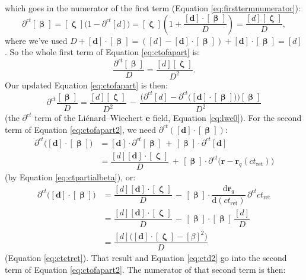 \documentclass[12pt]{article}
\renewcommand{\vv}[1]{\mathbf{#1}}
\newcommand{\dd}[1]{\mathrm{d}#1}
\newcommand{\vvbeta}{\bm{\upbeta}}
\newcommand{\vvzeta}{\bm{\upzeta}}
\begin{document}
which goes in the numerator of the first term (Equation \ref{eq:firsttermnumerator}):
\begin{equation}\label{eq:ctpartialbeta}
\partial^{ct} [\vvbeta] = [\vvzeta] \big( 1 - \partial^{ct} [d] \big) = [\vvzeta] \left( 1 + \dfrac{[\vv d] \cdot [\vvbeta]}{D} \right) = \dfrac{[d] [\vvzeta]}{D} ,
\end{equation}
where we've used $D + [\vv d] \cdot [\vvbeta] = ([d] - [\vv d] \cdot [\vvbeta]) + [\vv d] \cdot [\vvbeta] = [d]$. So the whole first term of Equation \ref{eq:ctofapart} is:
\begin{equation*}
\dfrac{\partial^{ct} [\vvbeta]}{D} = \dfrac{[d] [\vvzeta]}{D^2} .
\end{equation*}
Our updated Equation \ref{eq:ctofapart} is then:
\begin{equation}\label{eq:ctofapart2}
\partial^{ct} \dfrac{[\vvbeta]}{D} = \dfrac{[d] [\vvzeta]}{D^2} \, - \, \dfrac{\Big( \partial^{ct} [d] - \partial^{ct} \big( [\vv d] \cdot [\vvbeta] \big) \Big) [\vvbeta] }{D^2}
\end{equation}
(the $\partial^{ct}$ term of the Li\'enard--Wiechert $\vv e$ field, Equation \ref{eq:lwe0}). For the second term of Equation \ref{eq:ctofapart2}, we need $\partial^{ct} ([\vv d] \cdot [\vvbeta])$:
\begin{equation*}
\begin{aligned}
\partial^{ct} \big( [\vv d] \cdot [\vvbeta] \big) &= [\vv d] \cdot \partial^{ct} [\vvbeta] \, + \, [\vvbeta] \cdot \partial^{ct} [\vv d] \\[6pt]
&= \dfrac{[d] [\vv d] \cdot [\vvzeta] }{D} \, + \, [\vvbeta] \cdot \partial^{ct} \big( \vv r - \vv r_q(ct_{\mathrm{ret}}) \big)
\end{aligned}
\end{equation*}
(by Equation \ref{eq:ctpartialbeta}), or:
\begin{equation*}
\begin{aligned}
\partial^{ct} \big( [\vv d] \cdot [\vvbeta] \big) &= \dfrac{[d] [\vv d] \cdot [\vvzeta] }{D} \, - \, [\vvbeta] \cdot \dfrac{\dd \vv r_q}{\dd (ct_{\mathrm{ret}})} \, \partial^{ct} ct_{\mathrm{ret}} \\[6pt]
&= \dfrac{[d] [\vv d] \cdot [\vvzeta] }{D} \, - \, [\vvbeta] \cdot [\vvbeta] \, \dfrac{[d]}{D} \\[6pt]
&= \dfrac{[d] \big( [\vv d] \cdot [\vvzeta] - [\beta]^2 \big)}{D}
\end{aligned}
\end{equation*}
(Equation \ref{eq:ctctret}). That result and Equation \ref{eq:ctd2} go into the second term of Equation \ref{eq:ctofapart2}. The numerator of that second term is then:
\end{document}
